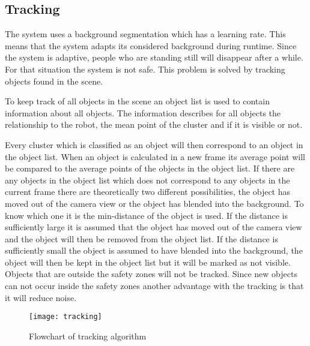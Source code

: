 
\subsection{Tracking}
The system uses a background segmentation which has a learning rate. This means that the system  adapts its considered background during runtime. Since the system is adaptive, people who are standing still will disappear after a while. For that situation the system is not safe. This problem is solved by tracking objects found in the scene. 


To keep track of all objects in the scene an object list is used to contain information about all objects. The information describes for all objects the relationship to the robot, the mean point of the cluster and if it is visible or not. 


Every cluster which is classified as an object will then correspond to an object in the object list. When an object is calculated in a new frame its average point will be compared to the average points of the objects in the object list. If there are any objects in the object list which does not correspond to any objects in the current frame there are theoretically two different possibilities, the object has moved out of the camera view or the object has blended into the background. To know which one it is the min-distance of the object is used. If the distance is sufficiently large it is assumed that the object has moved out of the camera view and the object will then be removed from the object list. If the distance is sufficiently small the object is assumed to have blended into the background, the object will then be kept in the object list but it will be marked as not visible. Objects that are outside the safety zones will not be tracked. Since new objects can not occur inside the safety zones another advantage with the tracking is that it will reduce noise.

\begin{figure}[H]
\begin{center}
\texttt{[image: tracking]}
\caption{Flowchart of tracking algorithm}
\label{tracking}
\end{center}
\end{figure}
